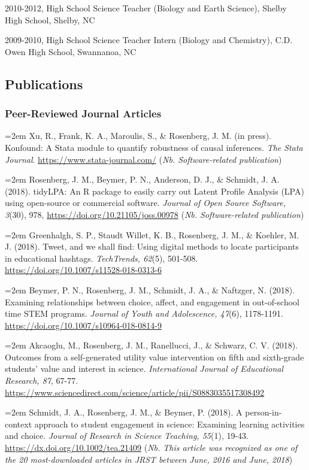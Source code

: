 \documentclass[]{article}
\begin{document}
2010-2012, High School Science Teacher (Biology and Earth Science),
Shelby High School, Shelby, NC

2009-2010, High School Science Teacher Intern (Biology and Chemistry),
C.D. Owen High School, Swannanoa, NC

\subsection{Publications}\label{publications}

\subsubsection{Peer-Reviewed Journal
Articles}\label{peer-reviewed-journal-articles}

\hangindent=2em Xu, R., Frank, K. A., Maroulis, S., \& Rosenberg, J. M.
(in press). Konfound: A Stata module to quantify robustness of causal
inferences. \emph{The Stata Journal}.
\url{https://www.stata-journal.com/} (\emph{Nb. Software-related
publication})

\hangindent=2em Rosenberg, J. M., Beymer, P. N., Anderson, D. J., \&
Schmidt, J. A. (2018). tidyLPA: An R package to easily carry out Latent
Profile Analysis (LPA) using open-source or commercial software.
\emph{Journal of Open Source Software, 3}(30), 978,
\url{https://doi.org/10.21105/joss.00978} (\emph{Nb. Software-related
publication})

\hangindent=2em Greenhalgh, S. P., Staudt Willet, K. B., Rosenberg, J.
M., \& Koehler, M. J. (2018). Tweet, and we shall find: Using digital
methods to locate participants in educational hashtags.
\emph{TechTrends, 62}(5), 501-508.
\url{https://doi.org/10.1007/s11528-018-0313-6}

\hangindent=2em Beymer, P. N., Rosenberg, J. M., Schmidt, J. A., \&
Naftzger, N. (2018). Examining relationships between choice, affect, and
engagement in out-of-school time STEM programs. \emph{Journal of Youth
and Adolescence, 47}(6), 1178-1191.
\url{https://doi.org/10.1007/s10964-018-0814-9}

\hangindent=2em Akcaoglu, M., Rosenberg, J. M., Ranellucci, J., \&
Schwarz, C. V. (2018). Outcomes from a self-generated utility value
intervention on fifth and sixth-grade students' value and interest in
science. \emph{International Journal of Educational Research, 87},
67-77.
\url{https://www.sciencedirect.com/science/article/pii/S0883035517308492}

\hangindent=2em Schmidt, J. A., Rosenberg, J. M., \& Beymer, P. (2018).
A person-in-context approach to student engagement in science: Examining
learning activities and choice. \emph{Journal of Research in Science
Teaching, 55}(1), 19-43. \url{https://dx.doi.org/10.1002/tea.21409}
(\emph{Nb. This article was recognized as one of the 20 most-downloaded
articles in JRST between June, 2016 and June, 2018})
\end{document}
